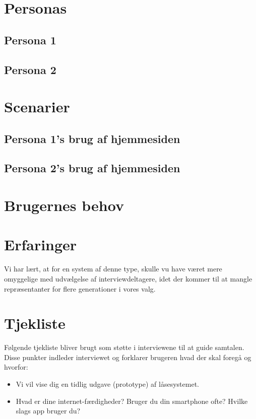 \documentclass[a4paper,12pt]{article}
\begin{document}
\section{Personas}
\subsection{Persona 1}
\subsection{Persona 2}

\section{Scenarier}
\subsection{Persona 1's brug af hjemmesiden}
\subsection{Persona 2's brug af hjemmesiden}

\section{Brugernes behov}

\section{Erfaringer}

Vi har lært, at for en system af denne type, skulle vu have været mere omyggelige med udvælgelse af interviewdeltagere, idet der kommer til at mangle repræsentanter for flere generationer i vores valg.

\newpage 
\appendix
\section{Tjekliste}
Følgende tjekliste bliver brugt som støtte i interviewene til at guide samtalen. \\
Disse punkter indleder interviewet og forklarer brugeren hvad der skal foregå og hvorfor:

\begin{itemize}
    \item Vi vil vise dig en tidlig udgave (prototype) af låsesystemet.
    \item Hvad er dine internet-færdigheder? Bruger du din smartphone ofte? Hvilke slags app bruger du?
\end{itemize}
\end{document}
